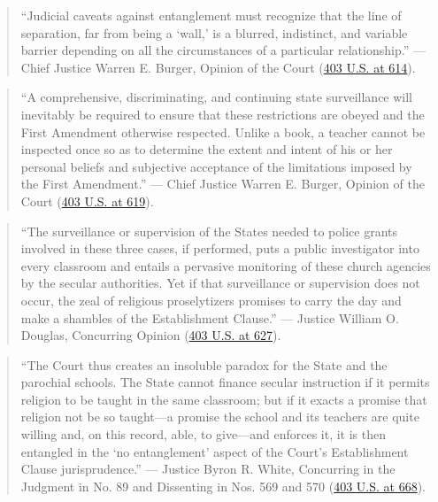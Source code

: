 \documentclass[12pt]{article}
\begin{document}
\begin{quote}
``Judicial caveats against entanglement must recognize that the line of separation, far from being a `wall,' is a blurred, indistinct, and variable barrier depending on all the circumstances of a particular relationship.''
--- Chief Justice Warren E. Burger, Opinion of the Court (\href{https://supreme.justia.com/cases/federal/us/403/602/}{403 U.S. at 614}).
\end{quote}

\begin{quote}
``A comprehensive, discriminating, and continuing state surveillance will inevitably be required to ensure that these restrictions are obeyed and the First Amendment otherwise respected. Unlike a book, a teacher cannot be inspected once so as to determine the extent and intent of his or her personal beliefs and subjective acceptance of the limitations imposed by the First Amendment.''
--- Chief Justice Warren E. Burger, Opinion of the Court (\href{https://supreme.justia.com/cases/federal/us/403/602/}{403 U.S. at 619}).
\end{quote}

\begin{quote}
``The surveillance or supervision of the States needed to police grants involved in these three cases, if performed, puts a public investigator into every classroom and entails a pervasive monitoring of these church agencies by the secular authorities. Yet if that surveillance or supervision does not occur, the zeal of religious proselytizers promises to carry the day and make a shambles of the Establishment Clause.''
--- Justice William O. Douglas, Concurring Opinion (\href{https://supreme.justia.com/cases/federal/us/403/602/}{403 U.S. at 627}).
\end{quote}

\begin{quote}
``The Court thus creates an insoluble paradox for the State and the parochial schools. The State cannot finance secular instruction if it permits religion to be taught in the same classroom; but if it exacts a promise that religion not be so taught---a promise the school and its teachers are quite willing and, on this record, able, to give---and enforces it, it is then entangled in the `no entanglement' aspect of the Court's Establishment Clause jurisprudence.''
--- Justice Byron R. White, Concurring in the Judgment in No. 89 and Dissenting in Nos. 569 and 570 (\href{https://supreme.justia.com/cases/federal/us/403/602/}{403 U.S. at 668}).
\end{quote}
\end{document}
